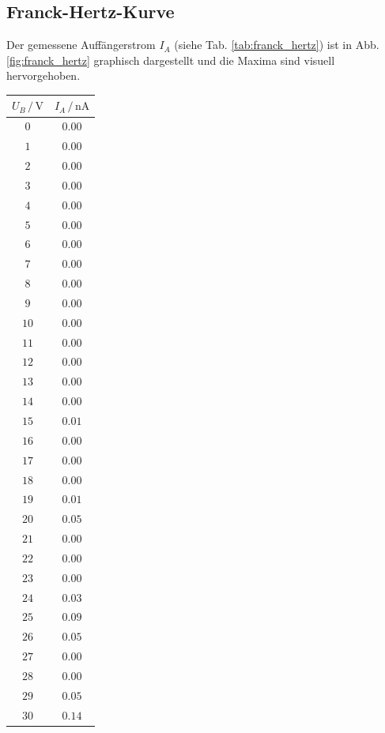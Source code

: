 \subsection{Franck-Hertz-Kurve}
Der gemessene Auffängerstrom $I_A$ (siehe Tab. \ref{tab:franck_hertz}) ist in Abb. \ref{fig:franck_hertz} graphisch dargestellt und die Maxima sind visuell hervorgehoben.
\begin{table}
    \centering
    \begin{tabular}{cc|}
        \toprule
        $U_B \,/\, \si{\volt}$ & $I_A \,/\, \si{\nano\ampere}$ \\
        \midrule
        $0$ & $0.00$ \\
        $1$ & $0.00$ \\
        $2$ & $0.00$ \\
        $3$ & $0.00$ \\
        $4$ & $0.00$ \\
        $5$ & $0.00$ \\
        $6$ & $0.00$ \\
        $7$ & $0.00$ \\
        $8$ & $0.00$ \\
        $9$ & $0.00$ \\
        $10$ & $0.00$ \\
        $11$ & $0.00$ \\
        $12$ & $0.00$ \\
        $13$ & $0.00$ \\
        $14$ & $0.00$ \\
        $15$ & $0.01$ \\
        $16$ & $0.00$ \\
        $17$ & $0.00$ \\
        $18$ & $0.00$ \\
        $19$ & $0.01$ \\
        $20$ & $0.05$ \\
        $21$ & $0.00$ \\
        $22$ & $0.00$ \\
        $23$ & $0.00$ \\
        $24$ & $0.03$ \\
        $25$ & $0.09$ \\
        $26$ & $0.05$ \\
        $27$ & $0.00$ \\
        $28$ & $0.00$ \\
        $29$ & $0.05$ \\
        $30$ & $0.14$ \\

\end{tabular}
\end{table}
